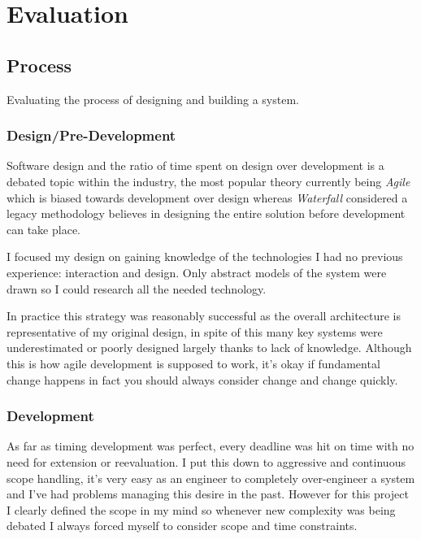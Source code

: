 \section{Evaluation}
\subsection{Process}
Evaluating the process of designing and building a system.

\subsubsection{Design/Pre-Development} 

Software design and the ratio of time spent on design over development is a debated topic within the industry, the most popular theory currently being \textit{Agile} which is biased towards development over design whereas \textit{Waterfall} considered a legacy methodology believes in designing the entire solution before development can take place.

I focused my design on gaining knowledge of the technologies I had no previous experience:  interaction and  design. Only abstract models of the system were drawn so I could research all the needed technology.


In practice this strategy was reasonably successful as the overall architecture is representative of my original design, in spite of this many key systems were underestimated or poorly designed largely thanks to lack of knowledge. Although this is how agile development is supposed to work, it's okay if fundamental change happens in fact you should always consider change and change quickly.

\subsubsection{Development}

As far as timing development was perfect, every deadline was hit on time with no need for extension or reevaluation. I put this down to aggressive and continuous scope handling, it's very easy as an engineer to completely over-engineer a system and I've had problems managing this desire in the past. However for this project I clearly defined the scope in my mind so whenever new complexity was being debated I always forced myself to consider scope and time constraints.

